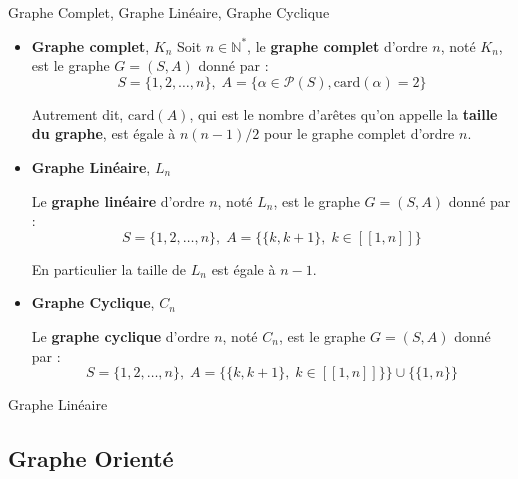 \begin{Definition}[colbacktitle=red!75!black]{Graphe Complet, Graphe Linéaire, Graphe Cyclique}{}

\begin{itemize}
    \item \textbf{Graphe complet}, $K_n$
        Soit $n \in \mathbb{N} ^*$, le \textbf{graphe complet} d'ordre $n$, noté $K_n$, est le graphe $G=(S,A)$ donné par :
 \[
     S = \{1,2,\ldots,n\},\; A = \{ \alpha \in \mathcal{P} (S) , \mathrm{car d} ( \alpha ) =2\}
\]

Autrement dit, $\mathrm{car d} (A)$, qui est le nombre d'arêtes qu'on appelle la \textbf{taille du graphe}, est égale à $n(n-1) / 2$ pour le graphe complet d'ordre $n$.
\item \textbf{Graphe Linéaire}, $L_n$

Le \textbf{graphe linéaire} d'ordre $n$, noté $L_n$, est le graphe $G = (S,A)$ donné par :
 \[
     S = \{1, 2, \ldots, n\},\; A = \{\{k, k+1\}, \; k \in [\![1,n]\!]\}
\]

En particulier la taille de $L_n$ est égale à $n-1$.

\item \textbf{Graphe Cyclique}, $C_n$

Le \textbf{graphe cyclique} d'ordre $n$, noté $C_n$, est le graphe $G = (S,A)$ donné par :
 \[
 S = \{1, 2, \ldots, n\},\; A = \{\{k, k+1\}, \; k \in [\![1,n]\!]\} \}\cup \{\{1,n\}\}
\]
\end{itemize}
\end{Definition}

\begin{Example}{Graphe Linéaire}{}
\begin{center}
\end{center}
\end{Example}

\subsection{Graphe Orienté} %

